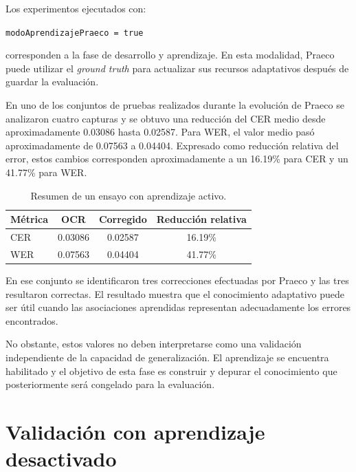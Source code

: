 Los experimentos ejecutados con:

\begin{center}
	\texttt{modoAprendizajePraeco = true}
\end{center}

corresponden a la fase de desarrollo y aprendizaje. En esta modalidad, Praeco puede utilizar el \textit{ground truth} para actualizar sus recursos adaptativos después de guardar la evaluación.

En uno de los conjuntos de pruebas realizados durante la evolución de Praeco se analizaron cuatro capturas y se obtuvo una reducción del CER medio desde aproximadamente 0.03086 hasta 0.02587. Para WER, el valor medio pasó aproximadamente de 0.07563 a 0.04404. Expresado como reducción relativa del error, estos cambios corresponden aproximadamente a un 16.19\% para CER y un 41.77\% para WER.

\begin{table}[htbp]
	\centering
	\caption{Resumen de un ensayo con aprendizaje activo.}
	\label{tab:aprendizaje-activo}
	\vspace{0.2cm}
	\begin{tabular}{lccc}
		\toprule
		\textbf{Métrica} & \textbf{OCR} & \textbf{Corregido} & \textbf{Reducción relativa} \\
		\midrule
		CER & 0.03086 & 0.02587 & 16.19\% \\
		WER & 0.07563 & 0.04404 & 41.77\% \\
		\bottomrule
	\end{tabular}
\end{table}

En ese conjunto se identificaron tres correcciones efectuadas por Praeco y las tres resultaron correctas. El resultado muestra que el conocimiento adaptativo puede ser útil cuando las asociaciones aprendidas representan adecuadamente los errores encontrados.

No obstante, estos valores no deben interpretarse como una validación independiente de la capacidad de generalización. El aprendizaje se encuentra habilitado y el objetivo de esta fase es construir y depurar el conocimiento que posteriormente será congelado para la evaluación.

\section{Validación con aprendizaje desactivado}

